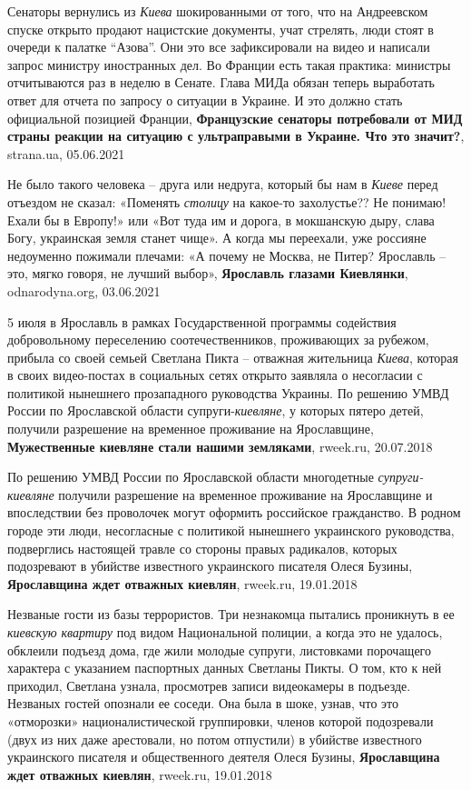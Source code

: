 Сенаторы вернулись из \emph{Киева} шокированными от того, что на Андреевском спуске
открыто продают нацистские документы, учат стрелять, люди стоят в очереди к
палатке \enquote{Азова}. Они это все зафиксировали на видео и написали запрос министру
иностранных дел. Во Франции есть такая практика: министры отчитываются раз в
неделю в Сенате. Глава МИДа обязан теперь выработать ответ для отчета по
запросу о ситуации в Украине. И это должно стать официальной позицией Франции,
\textbf{Французские сенаторы потребовали от МИД страны реакции на ситуацию с ультраправыми в Украине. Что это значит?},
strana.ua, 05.06.2021

Не было такого человека – друга или недруга, который бы нам в \emph{Киеве}
перед отъездом не сказал: «Поменять \emph{столицу} на какое-то захолустье?? Не
понимаю!  Ехали бы в Европу!» или «Вот туда им и дорога, в мокшанскую дыру,
слава Богу, украинская земля станет чище». А когда мы переехали, уже россияне
недоуменно пожимали плечами: «А почему не Москва, не Питер? Ярославль – это,
мягко говоря, не лучший выбор»,
\textbf{Ярославль глазами Киевлянки},
odnarodyna.org, 03.06.2021

5 июля в Ярославль в рамках Государственной программы содействия добровольному
переселению соотечественников, проживающих за рубежом, прибыла со своей семьей
Светлана Пикта – отважная жительница \emph{Киева}, которая в своих видео-постах
в социальных сетях открыто заявляла о несогласии с политикой нынешнего
прозападного руководства Украины. По решению УМВД России по Ярославской области
супруги-\emph{киевляне}, у которых пятеро детей, получили разрешение на
временное проживание на Ярославщине,
\textbf{Мужественные киевляне стали нашими земляками}, rweek.ru, 20.07.2018

По решению УМВД России по Ярославской области многодетные
\emph{супруги-киевляне} получили разрешение на временное проживание на
Ярославщине и впоследствии без проволочек могут оформить российское
гражданство. В родном городе эти люди, несогласные с политикой нынешнего
украинского руководства, подверглись настоящей травле со стороны правых
радикалов, которых подозревают в убийстве известного украинского писателя Олеся
Бузины,
\textbf{Ярославщина ждет отважных киевлян}, rweek.ru, 19.01.2018

Незваные гости из базы террористов. Три незнакомца пытались проникнуть в ее
\emph{киевскую квартиру} под видом Национальной полиции, а когда это не удалось,
обклеили подъезд дома, где жили молодые супруги, листовками порочащего
характера с указанием паспортных данных Светланы Пикты. О том, кто к ней
приходил, Светлана узнала, просмотрев записи видеокамеры в подъезде. Незваных
гостей опознали ее соседи. Она была в шоке, узнав, что это «отморозки»
националистической группировки, членов которой подозревали (двух из них даже
арестовали, но потом отпустили) в убийстве известного украинского писателя и
общественного деятеля Олеся Бузины,
\textbf{Ярославщина ждет отважных киевлян}, rweek.ru, 19.01.2018

